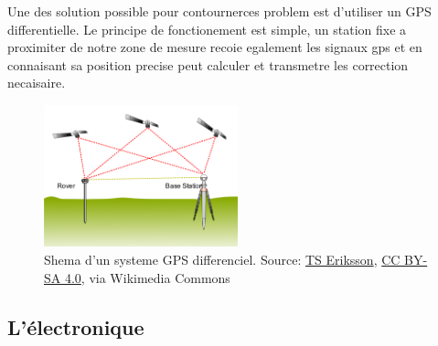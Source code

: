 Une des solution possible pour contournerces problem est d'utiliser un GPS differentielle. Le principe de fonctionement est simple, un station fixe a proximiter de notre zone de mesure recoie egalement les signaux gps et en connaisant sa position precise peut calculer et transmetre les correction necaisaire.~\cite{site:GPS_diff}
\begin{figure}
    \centering
    \includegraphics[width=0.5\textwidth]{img/she/Real_time_kinematic.png}
    \caption[Shema d'un systeme GPS differenciel]{Shema d'un systeme GPS differenciel. Source: \href{https://commons.wikimedia.org/wiki/File:Real_time_kinematic.svg}{TS Eriksson}, \href{https://creativecommons.org/licenses/by-sa/4.0}{CC BY-SA 4.0}, via Wikimedia Commons}
    \label{fig:RTK}
\end{figure}

\subsection{L'électronique}

    